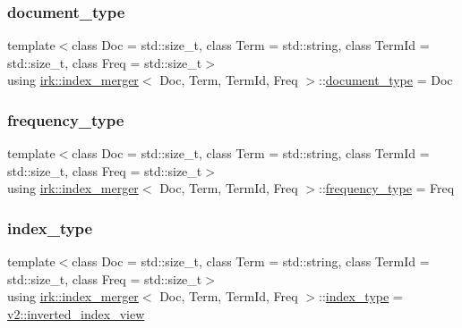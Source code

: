 \subsubsection{\texorpdfstring{document\+\_\+type}{document\_type}}
{\footnotesize\ttfamily template$<$class Doc = std\+::size\+\_\+t, class Term = std\+::string, class Term\+Id = std\+::size\+\_\+t, class Freq = std\+::size\+\_\+t$>$ \\
using \mbox{\hyperlink{classirk_1_1index__merger}{irk\+::index\+\_\+merger}}$<$ Doc, Term, Term\+Id, Freq $>$\+::\mbox{\hyperlink{classirk_1_1index__merger_ace9b689f5d38f6aeed3ce16f0f1bd260}{document\+\_\+type}} =  Doc}

\mbox{\label{classirk_1_1index__merger_a6cb409ab2e737118969206ee9b27d147}} 
\subsubsection{\texorpdfstring{frequency\+\_\+type}{frequency\_type}}
{\footnotesize\ttfamily template$<$class Doc = std\+::size\+\_\+t, class Term = std\+::string, class Term\+Id = std\+::size\+\_\+t, class Freq = std\+::size\+\_\+t$>$ \\
using \mbox{\hyperlink{classirk_1_1index__merger}{irk\+::index\+\_\+merger}}$<$ Doc, Term, Term\+Id, Freq $>$\+::\mbox{\hyperlink{classirk_1_1index__merger_a6cb409ab2e737118969206ee9b27d147}{frequency\+\_\+type}} =  Freq}

\mbox{\label{classirk_1_1index__merger_a1bf6f9a6e9b338abc526274e3ba7407c}} 
\subsubsection{\texorpdfstring{index\+\_\+type}{index\_type}}
{\footnotesize\ttfamily template$<$class Doc = std\+::size\+\_\+t, class Term = std\+::string, class Term\+Id = std\+::size\+\_\+t, class Freq = std\+::size\+\_\+t$>$ \\
using \mbox{\hyperlink{classirk_1_1index__merger}{irk\+::index\+\_\+merger}}$<$ Doc, Term, Term\+Id, Freq $>$\+::\mbox{\hyperlink{classirk_1_1index__merger_a1bf6f9a6e9b338abc526274e3ba7407c}{index\+\_\+type}} =  \mbox{\hyperlink{classirk_1_1v2_1_1inverted__index__view}{v2\+::inverted\+\_\+index\+\_\+view}}}

